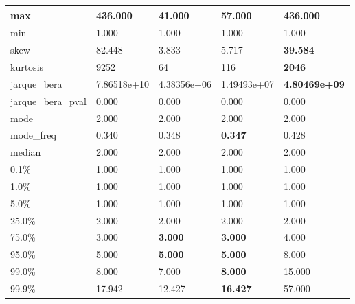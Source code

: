 \begin{table}[H]
\begin{tabular}{|l|m{10em}|m{10em}|m{10em}|m{10em}|}
\hline max & 436.000 & \cellcolor[rgb]{0.9, 0.54, 0.52} 41.000 & 57.000 & \bfseries 436.000 \\
\hline min & 1.000 & 1.000 & 1.000 & 1.000 \\
\hline skew & 82.448 & \cellcolor[rgb]{0.9, 0.54, 0.52} 3.833 & 5.717 & \bfseries 39.584 \\
\hline kurtosis & 9252 & \cellcolor[rgb]{0.9, 0.54, 0.52} 64 & 116 & \bfseries 2046 \\
\hline jarque\_bera & 7.86518e+10 & \cellcolor[rgb]{0.9, 0.54, 0.52} 4.38356e+06 & 1.49493e+07 & \bfseries 4.80469e+09 \\
\hline jarque\_bera\_pval & 0.000 & 0.000 & 0.000 & 0.000 \\
\hline mode & 2.000 & 2.000 & 2.000 & 2.000 \\
\hline mode\_freq & 0.340 & 0.348 & \bfseries 0.347 & \cellcolor[rgb]{0.9, 0.54, 0.52} 0.428 \\
\hline median & 2.000 & 2.000 & 2.000 & 2.000 \\
\hline 0.1\% & 1.000 & 1.000 & 1.000 & 1.000 \\
\hline 1.0\% & 1.000 & 1.000 & 1.000 & 1.000 \\
\hline 5.0\% & 1.000 & 1.000 & 1.000 & 1.000 \\
\hline 25.0\% & 2.000 & 2.000 & 2.000 & 2.000 \\
\hline 75.0\% & 3.000 & \bfseries 3.000 & \bfseries 3.000 & \cellcolor[rgb]{0.9, 0.54, 0.52} 4.000 \\
\hline 95.0\% & 5.000 & \bfseries 5.000 & \bfseries 5.000 & \cellcolor[rgb]{0.9, 0.54, 0.52} 8.000 \\
\hline 99.0\% & 8.000 & 7.000 & \bfseries 8.000 & \cellcolor[rgb]{0.9, 0.54, 0.52} 15.000 \\
\hline 99.9\% & 17.942 & 12.427 & \bfseries 16.427 & \cellcolor[rgb]{0.9, 0.54, 0.52} 57.000 \\
\hline
\end{tabular}
\end{table}
